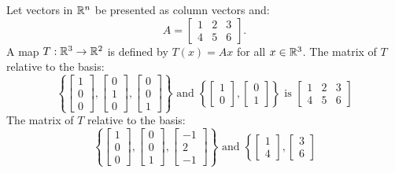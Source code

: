 \documentclass[../main/main.tex]{subfiles}
\begin{document}
\begin{example}
   Let vectors in $ \mathbb{R}^{n}$ be presented as column vectors and: \[
       A = \begin{bmatrix} 1&2&3\\4&5&6 \end{bmatrix}
   .\] A map $T: \mathbb{R}^{3} \to  \mathbb{R}^2$ is defined by $T(x) = Ax$ for all  $x\in \mathbb{R}^{3}$. The matrix of $T$ relative to the basis:  \[
   \left\{
   \begin{bmatrix} 1\\0\\0 \end{bmatrix} ,
   \begin{bmatrix} 0\\1\\0 \end{bmatrix} ,
   \begin{bmatrix} 0\\0\\1 \end{bmatrix} 
   \right\}  \text{ and }
   \left \{
       \begin{bmatrix} 1\\0 \end{bmatrix},
       \begin{bmatrix} 0\\1 \end{bmatrix} 
   \right\} 
   \text{ is }
    \begin{bmatrix} 1&2&3\\4&5&6 \end{bmatrix}
   \] 
   The matrix of $T$ relative to the basis:
   \[
   \left\{
   \begin{bmatrix} 1\\0\\0 \end{bmatrix} ,
   \begin{bmatrix} 0\\0\\1 \end{bmatrix} ,
   \begin{bmatrix} -1\\2\\-1 \end{bmatrix} 
   \right\}  \text{ and }
   \left \{
       \begin{bmatrix} 1\\4 \end{bmatrix},
       \begin{bmatrix} 3\\6 \end{bmatrix} 
\]
\end{example}
\end{document}
